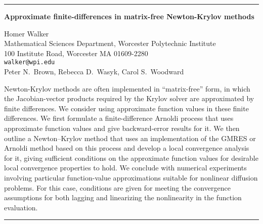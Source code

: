 \documentclass[twosided]{report}
\begin{document}
	\begin{center} \rule{6in}{1pt} \end{center}

\begin{center}
{\large			%
{\bf Approximate finite-differences in matrix-free Newton-Krylov methods}}

	Homer Walker \\
	Mathematical Sciences Department, Worcester Polytechnic Institute \\
	100 Institute Road, Worcester MA 01609-2280 \\
	{\tt walker@wpi.edu} \\
	Peter N.~Brown, Rebecca D.~Wasyk, Carol S.~Woodward
\end{center}
Newton-Krylov methods are often implemented in
``matrix-free'' form, in which the Jacobian-vector products
required by the Krylov solver are approximated by finite
differences. We consider using approximate function values
in these finite differences. We first formulate a
finite-difference Arnoldi process that uses approximate
function values and give backward-error results for it. We
then outline a Newton--Krylov method that uses an
implementation of the GMRES or Arnoldi method based on this
process and develop a local convergence analysis for it,
giving sufficient conditions on the approximate function
values for desirable local convergence properties to hold.
We conclude with numerical experiments involving particular
function-value approximations suitable for nonlinear
diffusion problems. For this case, conditions are given for
meeting the convergence assumptions for both lagging and
linearizing the nonlinearity in the function evaluation.



	\begin{center} \rule{6in}{1pt} \end{center}
\end{document}
